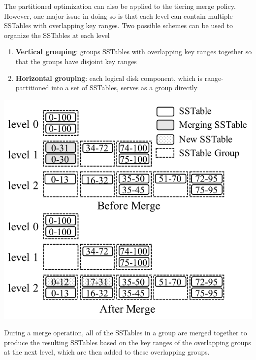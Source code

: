 \documentclass[11pt]{article}
\begin{document}
The partitioned optimization can also be applied to the tiering merge policy. However, one major issue
in doing so is that each level can contain multiple SSTables with overlapping key ranges. Two possible
schemes can be used to organize the SSTables at each level
\begin{enumerate}
\item \textbf{Vertical grouping}: groups SSTables with overlapping key ranges together so that the groups have
disjoint key ranges
\item \textbf{Horizontal grouping}: each logical disk component, which is range-partitioned into a set of
SSTables, serves as a group directly
\end{enumerate}

\begin{center}
\includegraphics[width=.8\textwidth]{../../images/db/6.png}
\end{center}
During a merge operation, all of the SSTables in a group are merged together to produce the resulting
SSTables based on the key ranges of the overlapping groups at the next level, which are then added to
these overlapping groups.
\end{document}
